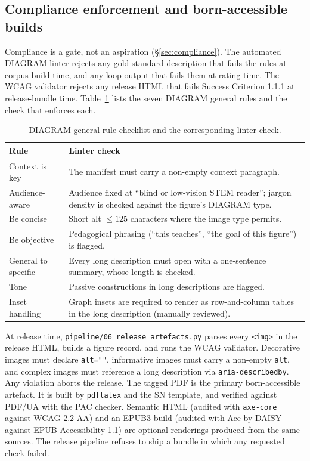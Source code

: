 \documentclass[pdflatex,sn-mathphys-num]{sn-jnl}
\begin{document}
\begin{appendices}
\section{Compliance enforcement and born-accessible builds}\label{app:compliance}
\setcounter{figure}{0}\setcounter{table}{0}

Compliance is a gate, not an aspiration (\S\ref{sec:compliance}). The automated DIAGRAM linter rejects any gold-standard description that fails the rules at corpus-build time, and any loop output that fails them at rating time. The WCAG validator rejects any release HTML that fails Success Criterion 1.1.1 at release-bundle time. Table~\ref{tab:diagram-checklist} lists the seven DIAGRAM general rules and the check that enforces each.

\begin{table}[!htb]
\caption{DIAGRAM general-rule checklist and the corresponding linter check.}\label{tab:diagram-checklist}
\centering
\small
\begin{tabular}{p{}p{}}
\toprule
Rule & Linter check \\
\midrule
Context is key & The manifest must carry a non-empty context paragraph. \\
Audience-aware & Audience fixed at ``blind or low-vision STEM reader''; jargon density is checked against the figure's DIAGRAM type. \\
Be concise & Short alt $\leq 125$ characters where the image type permits. \\
Be objective & Pedagogical phrasing (``this teaches'', ``the goal of this figure'') is flagged. \\
General to specific & Every long description must open with a one-sentence summary, whose length is checked. \\
Tone & Passive constructions in long descriptions are flagged. \\
Inset handling & Graph insets are required to render as row-and-column tables in the long description (manually reviewed). \\
\bottomrule
\end{tabular}
\end{table}

At release time, \texttt{pipeline/06\_release\_artefacts.py} parses every \texttt{<img>} in the release HTML, builds a figure record, and runs the WCAG validator. Decorative images must declare \texttt{alt=""}, informative images must carry a non-empty \texttt{alt}, and complex images must reference a long description via \texttt{aria-describedby}. Any violation aborts the release. The tagged PDF is the primary born-accessible artefact. It is built by \texttt{pdflatex} and the SN template, and verified against PDF/UA with the PAC checker. Semantic HTML (audited with \texttt{axe-core} against WCAG 2.2 AA) and an EPUB3 build (audited with Ace by DAISY against EPUB Accessibility 1.1) are optional renderings produced from the same sources. The release pipeline refuses to ship a bundle in which any requested check failed.


\end{appendices}
\end{document}
